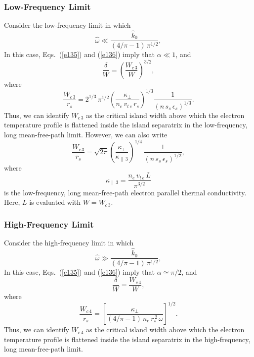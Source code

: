 \documentclass[12pt,prb,aps]{revtex4-1}
\begin{document}
\subsubsection{Low-Frequency Limit}
Consider the low-frequency limit in which
\begin{equation}
\hat{\omega}\ll \frac{\hat{k}_0}{(4/\pi-1)\,\pi^{1/2}},
\end{equation}
In this case, Eqs.~(\ref{e135}) and (\ref{e136}) imply that $\alpha\ll 1$, and
\begin{equation}
\frac{\delta}{W}= \left(\frac{W_{c\,3}}{W}\right)^{3/2},
\end{equation}
where\,\cite{rf}
\begin{equation}
\frac{W_{c\,3}}{r_s} =
2^{1/3}\,\pi^{1/2}\left(\frac{\kappa_\perp}{n_e\,v_{t\,e}\,r_s}\right)^{1/3}\frac{1}{(n\,s_s\,\epsilon_s)^{1/3}}.
\end{equation}
Thus, we
can identify $W_{c\,3}$ as the critical island width above which the electron temperature profile is flattened inside the island separatrix
in the  low-frequency, long mean-free-path limit. However, we can also write
\begin{equation}\label{wc3}
\frac{W_{c\,3}}{r_s} =
\sqrt{2\pi}\left(\frac{\kappa_\perp}{\kappa_{\parallel\,3}}\right)^{1/4}\,\frac{1}{(n\,s_s\,\epsilon_s)^{1/2}},
\end{equation}
where
\begin{equation}
\kappa_{\parallel\,3} =\frac{n_e\,v_{t\,e}\,L}{\pi^{3/2}}
\end{equation}
is the low-frequency, long mean-free-path electron parallel thermal conductivity. Here, $L$ is evaluated with $W=W_{c\,3}$. 

\subsubsection{High-Frequency Limit}
Consider the high-frequency limit in which
\begin{equation}
\hat{\omega}\gg \frac{\hat{k}_0}{(4/\pi-1)\,\pi^{1/2}},
\end{equation}
In this case, Eqs.~(\ref{e135}) and (\ref{e136}) imply that $\alpha\simeq \pi/2$, and
\begin{equation}
 \frac{\delta}{W} = \frac{W_{c\,4}}{W},
 \end{equation}
 where 
  \begin{equation}
 \frac{W_{c\,4}}{r_s} = \left[\frac{\kappa_\perp}{(4/\pi-1)\,n_e\,r_s^{\,2}\,\omega}\right]^{1/2}.
 \end{equation}
Thus, we
can identify $W_{c\,4}$ as the critical island width above which the electron temperature profile is flattened inside the island separatrix
in the  high-frequency, long mean-free-path limit.
\end{document}
